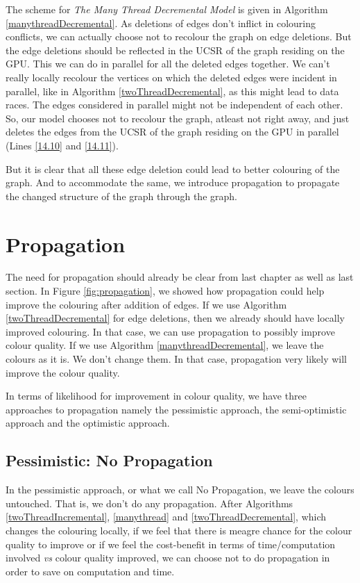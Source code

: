 \documentclass[MTech]{iitmdiss}
\begin{document}
The scheme for \textit{The Many Thread Decremental Model} is given in Algorithm \ref{manythreadDecremental}. As deletions of edges don't inflict in colouring conflicts, we can actually choose not to recolour the graph on edge deletions. But the edge deletions should be reflected in the UCSR of the graph residing on the GPU. This we can do in parallel for all the deleted edges together. We can't really locally recolour the vertices on which the deleted edges were incident in parallel, like in Algorithm \ref{twoThreadDecremental}, as this might lead to data races. The edges considered in parallel might not be independent of each other. So, our model chooses not to recolour the graph, atleast not right away, and just deletes the edges from the UCSR of the graph residing on the GPU in parallel (Lines \ref{14.10} and \ref{14.11}).

But it is clear that all these edge deletion could lead to better colouring of the graph. And to accommodate the same, we introduce propagation to propagate the changed structure of the graph through the graph. 

\section{Propagation}
The need for propagation should already be clear from last chapter as well as last section. In Figure \ref{fig:propagation}, we showed how propagation could help improve the colouring after addition of edges. If we use Algorithm \ref{twoThreadDecremental} for edge deletions, then we already should have locally improved colouring. In that case, we can use propagation to possibly improve colour quality. If we use Algorithm \ref{manythreadDecremental}, we leave the colours as it is. We don't change them. In that case, propagation very likely will improve the colour quality.

In terms of likelihood for improvement in colour quality, we have three approaches to propagation namely the pessimistic approach, the semi-optimistic approach and the optimistic approach.

\subsection{Pessimistic: No Propagation}
In the pessimistic approach, or what we call No Propagation, we leave the colours untouched. That is, we don't do any propagation. After Algorithms \ref{twoThreadIncremental}, \ref{manythread} and \ref{twoThreadDecremental}, which changes the colouring locally, if we feel that there is meagre chance for the colour quality to improve or if we feel the cost-benefit in terms of time/computation involved \textit{vs} colour quality improved, we can choose not to do propagation in order to save on computation and time.
\end{document}

